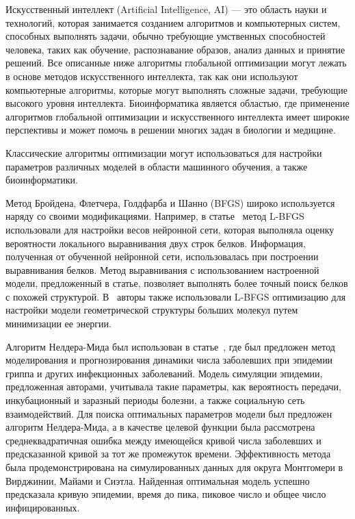 Искусственный интеллект (Artificial Intelligence, AI) --- это область науки и технологий, которая занимается созданием алгоритмов и компьютерных систем, способных выполнять задачи, обычно требующие умственных способностей человека, таких как обучение, распознавание образов, анализ данных и принятие решений.
Все описанные ниже алгоритмы глобальной оптимизации могут лежать в основе методов искусственного интеллекта, так как они используют компьютерные алгоритмы, которые могут выполнять сложные задачи, требующие высокого уровня интеллекта.
Биоинформатика является областью, где применение алгоритмов глобальной оптимизации и искусственного интеллекта имеет широкие перспективы и может помочь в решении многих задач в биологии и медицине.



Классические алгоритмы оптимизации могут использоваться для настройки параметров различных моделей в области машинного обучения, а также биоинформатики.

Метод Бройдена, Флетчера, Голдфарба и Шанно (BFGS) широко используется наряду со своими модификациями. Например, в статье~\cite{ma2013protein} метод L-BFGS использовали для настройки весов нейронной сети, которая выполняла оценку вероятности локального выравнивания двух строк белков.
Информация, полученная от обученной нейронной сети, использовалась при построении выравнивания белков.
Метод выравнивания с использованием настроенной модели, предложенный в статье, позволяет выполнять более точный поиск белков с похожей структурой.
В~\cite{stewart2009application} авторы также использовали L-BFGS оптимизацию для настройки модели геометрической структуры больших молекул путем минимизации ее энергии.

Алгоритм Нелдера-Мида был использован в статье~\cite{nsoesie2013simulation}, где был предложен метод моделирования и прогнозирования динамики числа заболевших при эпидемии гриппа и других инфекционных заболеваний.
Модель симуляции эпидемии, предложенная авторами, учитывала такие параметры, как вероятность передачи, инкубационный и заразный периоды болезни, а также социальную сеть взаимодействий.
Для поиска оптимальных параметров модели был предложен алгоритм Нелдера-Мида, а в качестве целевой функции была рассмотрена среднеквадратичная ошибка между имеющейся кривой числа заболевших и предсказанной кривой за тот же промежуток времени.
Эффективность метода была продемонстрирована на симулированных данных для округа Монтгомери в Вирджинии, Майами и Сиэтла.
Найденная оптимальная модель успешно предсказала кривую эпидемии, время до пика, пиковое число и общее число инфицированных.

